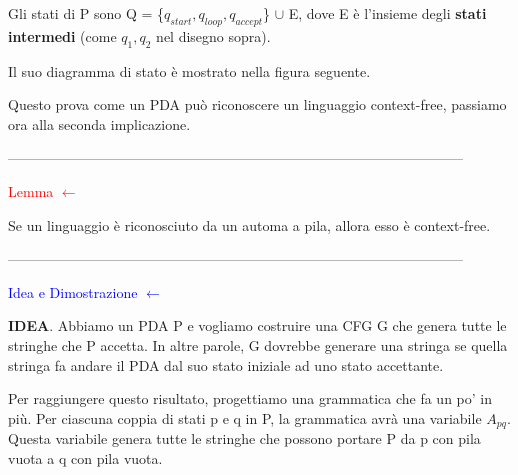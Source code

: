 \documentclass{article}
\begin{document}
Gli stati di P sono Q = \{$q_{start}, q_{loop}, q_{accept}$\} $\cup$ E, dove E è
l'insieme degli \textbf{stati intermedi} (come $q_1, q_2$ nel disegno sopra).

Il suo diagramma di stato è mostrato nella figura seguente.

\begin{center}
\end{center}

Questo prova come un PDA può riconoscere un linguaggio context-free, passiamo
ora alla seconda implicazione.

--------------------------------------------------------------------------------------------------

\begin{center}
    \textcolor{red}{Lemma $\leftarrow$}
\end{center}

Se un linguaggio è riconosciuto da un automa a pila, allora esso è context-free.

--------------------------------------------------------------------------------------------------

\textcolor{blue}{Idea e Dimostrazione $\leftarrow$}

\textbf{IDEA}. Abbiamo un PDA P e vogliamo costruire una CFG G che genera tutte
le stringhe che P accetta. In altre parole, G dovrebbe generare una stringa se
quella stringa fa andare il PDA dal suo stato iniziale ad uno stato accettante.

Per raggiungere questo risultato, progettiamo una grammatica che fa un po' in
più. Per ciascuna coppia di stati p e q in P, la grammatica avrà una variabile
$A_{pq}$. Questa variabile genera tutte le stringhe che possono portare P da p
con pila vuota a q con pila vuota.
\end{document}
